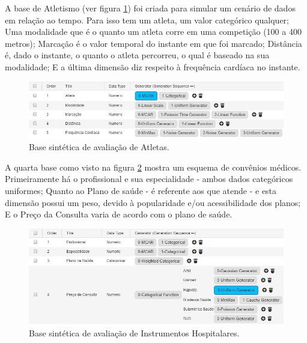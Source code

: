 \documentclass[
	12pt,				%
	openright,			%
	twoside,			%
	a4paper,			%
	english,			%
	brazil				%
	]{abntex2}
\begin{document}
		A base de Atletismo (ver figura \ref{fig:AtletaModelo}) foi criada para simular um cenário de dados em relação ao tempo.
		Para isso tem um atleta, um valor categórico qualquer;
		Uma modalidade que é o quanto um atleta corre em uma competição (100 a 400 metros);
		Marcação é o valor temporal do instante em que foi marcado;
		Distância é, dado o instante, o quanto o atleta percorreu, o qual é baseado na sua modalidade;
		E a última dimensão diz respeito à frequência cardíaca no instante.
		\par
		\begin{figure}[h!]
			\centering
			\includegraphics[width=\linewidth]{./figures/Resultados/AtletaModelo.jpg}
			\caption{Base sintética de avaliação de Atletas.}
			\label{fig:AtletaModelo}
		\end{figure}
		
		A quarta base como visto na figura \ref{fig:CMModelo} mostra um esquema de convênios médicos.
		Primeiramente há o profissional e sua especialidade - ambos dados categóricos uniformes;
		Quanto ao Plano de saúde - é referente aos que atende - e esta dimensão possui um peso, devido à popularidade e/ou acessibilidade dos planos;
		E o Preço da Consulta varia de acordo com o plano de saúde.
		\par
		\begin{figure}[h!]
			\centering
			\includegraphics[width=\linewidth]{./figures/Resultados/CMModelo.jpg}
			\caption{Base sintética de avaliação de Instrumentos Hospitalares.}
			\label{fig:CMModelo}
		\end{figure}
\end{document}
